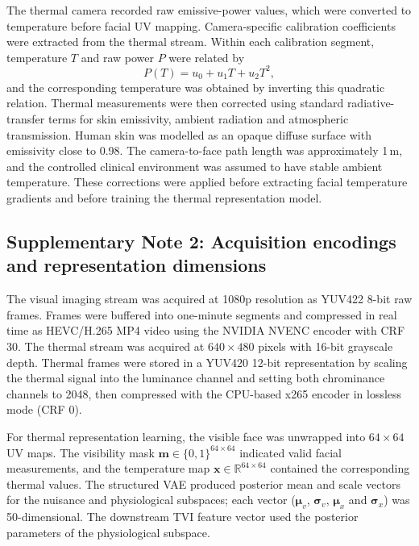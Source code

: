 \documentclass[pdflatex,sn-basic,Numbered]{sn-jnl}
\theoremstyle{thmstyleone}%
\theoremstyle{thmstyletwo}%
\theoremstyle{thmstylethree}%
\begin{document}
The thermal camera recorded raw emissive-power values, which were converted to temperature before facial UV mapping. Camera-specific calibration coefficients were extracted from the thermal stream. Within each calibration segment, temperature $T$ and raw power $P$ were related by
\[
  P(T) = u_0 + u_1T + u_2T^2,
\]
and the corresponding temperature was obtained by inverting this quadratic relation. Thermal measurements were then corrected using standard radiative-transfer terms for skin emissivity, ambient radiation and atmospheric transmission. Human skin was modelled as an opaque diffuse surface with emissivity close to 0.98. The camera-to-face path length was approximately 1\,m, and the controlled clinical environment was assumed to have stable ambient temperature. These corrections were applied before extracting facial temperature gradients and before training the thermal representation model.

\subsection*{Supplementary Note 2: Acquisition encodings and representation dimensions}

The visual imaging stream was acquired at 1080p resolution as YUV422 8-bit raw frames. Frames were buffered into one-minute segments and compressed in real time as HEVC/H.265 MP4 video using the NVIDIA NVENC encoder with CRF 30. The thermal stream was acquired at $640\times480$ pixels with 16-bit grayscale depth. Thermal frames were stored in a YUV420 12-bit representation by scaling the thermal signal into the luminance channel and setting both chrominance channels to 2048, then compressed with the CPU-based x265 encoder in lossless mode (CRF 0).

For thermal representation learning, the visible face was unwrapped into $64\times64$ UV maps. The visibility mask $\mathbf{m}\in\{0,1\}^{64\times64}$ indicated valid facial measurements, and the temperature map $\mathbf{x}\in\mathbb{R}^{64\times64}$ contained the corresponding thermal values. The structured VAE produced posterior mean and scale vectors for the nuisance and physiological subspaces; each vector ($\bm{\mu}_{v}$, $\bm{\sigma}_{v}$, $\bm{\mu}_{x}$ and $\bm{\sigma}_{x}$) was 50-dimensional. The downstream TVI feature vector used the posterior parameters of the physiological subspace.
\end{document}
